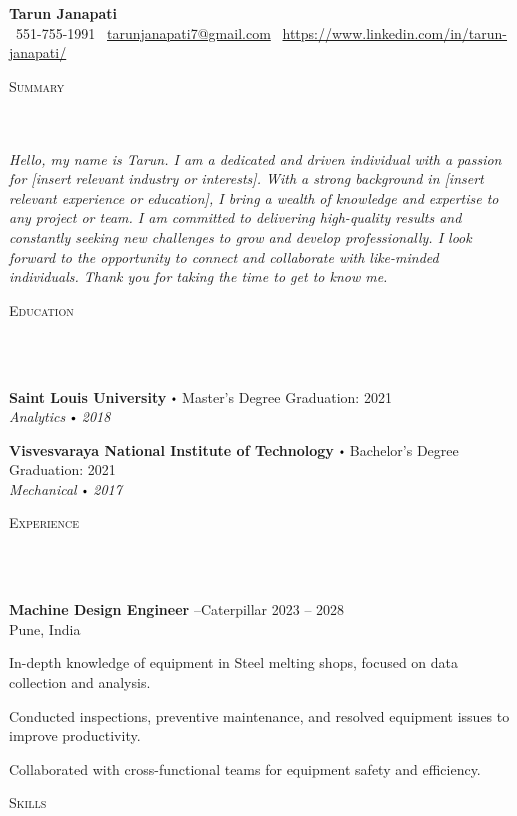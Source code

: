 \documentclass{article}
\newcommand{\school}[4]{
        \textbf{#1} \labelitemi #2 \hfill #3 \\ #4 \vspace*{5pt}
      }
\newcommand{\employer}[4]{{
        \vspace*{2pt}%
        \textbf{#1} #2 \hfill #3\\ #4 \vspace*{2pt}}
        }
\newcommand{\lineunder}{
        \vspace*{-8pt} \\ \hspace*{-18pt} 
        \hrulefill \\
        }
\newcommand{\header}[1]{{
        \hspace*{-15pt}\vspace*{6pt} \textsc{#1}} \vspace*{-6pt} 
        \lineunder
        }
\renewcommand{\labelitemi}{
        $\vcenter{\hbox{\tiny$\bullet$}}$\hspace*{3pt}
        }
\renewcommand{\labelitemii}{
        $\vcenter{\hbox{\tiny$\bullet$}}$\hspace*{-3pt}
        }
\newenvironment{bullet-list-minor}{
          \begin{list}{\labelitemii}{\setlength\leftmargin{15pt} 
            \topsep 0pt \itemsep -2pt}}{\vspace*{4pt}\end{list}
            }
\begin{document}
  
      \small
      \smallskip
      \vspace*{-44pt}
  
      \begin{center}
        {\LARGE \textbf{Tarun Janapati}} \\
        \faPhone\ 551-755-1991 \quad
        \faEnvelope\ \href{mailto:tarunjanapati7@gmail.com}{tarunjanapati7@gmail.com} \quad
        \faLinkedin\ \url{https://www.linkedin.com/in/tarun-janapati/}
      \end{center}
     \vspace*{4pt}%
      \header{Summary}
  
      {
        \textit{Hello, my name is Tarun. I am a dedicated and driven individual with a passion for [insert relevant industry or interests]. With a strong background in [insert relevant experience or education], I bring a wealth of knowledge and expertise to any project or team. I am committed to delivering high-quality results and constantly seeking new challenges to grow and develop professionally. I look forward to the opportunity to connect and collaborate with like-minded individuals. Thank you for taking the time to get to know me.}
        }
  
      \vspace{15pt}
  
     \header{Education}
  
      {
        \school{Saint Louis University}{Master's Degree}{Graduation: 2021}{\textit{Analytics \labelitemi 2018}}
        

        \school{Visvesvaraya National Institute of Technology}{Bachelor's Degree}{Graduation: 2021}{\textit{Mechanical \labelitemi 2017}}
        }
  
      \vspace*{4pt}%
      \header{Experience}
  
      {
      \employer{Machine Design Engineer}{--Caterpillar}{2023 -- 2028}{Pune, India}
      \begin{bullet-list-minor}
          \item In-depth knowledge of equipment in Steel melting shops, focused on data collection and analysis.
\item Conducted inspections, preventive maintenance, and resolved equipment issues to improve productivity.
\item Collaborated with cross-functional teams for equipment safety and efficiency.
      \end{bullet-list-minor}
  }
      \vspace*{4pt}%
      \header{Skills}
  
\end{document}
